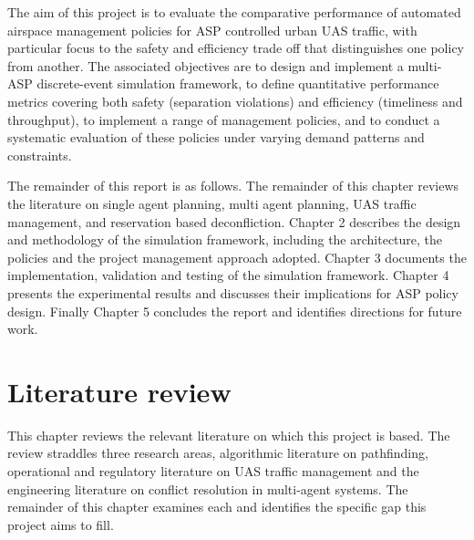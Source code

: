\vspace{1em}

The aim of this project is to evaluate the comparative performance of automated airspace management policies for ASP controlled urban UAS traffic, with particular focus to the safety and efficiency trade off that distinguishes one policy from another. The associated objectives are to design and implement a multi-ASP discrete-event simulation framework, to define quantitative performance metrics covering both safety (separation violations) and efficiency (timeliness and throughput), to implement a range of management policies, and to conduct a systematic evaluation of these policies under varying demand patterns and constraints. \par

\vspace{1em}

The remainder of this report is as follows. The remainder of this chapter reviews the literature on single agent planning, multi agent planning, UAS traffic management, and reservation based deconfliction. Chapter 2 describes the design and methodology of the simulation framework, including the architecture, the policies and the project management approach adopted. Chapter 3 documents the implementation, validation and testing of the simulation framework. Chapter 4 presents the experimental results and discusses their implications for ASP policy design. Finally Chapter 5 concludes the report and identifies directions for future work.\par


\vspace{1em}

\section{Literature review}

This chapter reviews the relevant literature on which this project is based. The review straddles three research areas, algorithmic literature on pathfinding, operational and regulatory literature on UAS traffic management and the engineering literature on conflict resolution in multi-agent systems. The remainder of this chapter examines each and identifies the specific gap this project aims to fill. \par

\vspace{1em}


